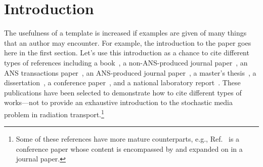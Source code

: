 \documentclass{article}                                                                           %
\begin{document}
\begin{abstract}
Having an appropriate {\LaTeX} template available when writing new papers saves authors time and effort.
As of the summer of 2017, the American Nuclear Society (ANS) had not had a {\LaTeX} template for submissions to their three journals: Nuclear Science and Engineering (NSE), Nuclear Technology (NT), and Fusion Science and Technology (FST).
While such a template may have existed in one or more forms and enjoyed use in a subset of the nuclear engineering community, asking colleagues did not yield knowledge of such a template.
We therefore asked the ANS editors if they would be interested in such a template, iterated with them to create one which was in agreement with the journal submission guidelines, and have provided it for the journal community to use.
Submissions need not strictly adhere to a specific form beyond what is specified in the submission guidelines since ANS will reformat accepted submissions for publication, we expect that this template will speed up the publishing process for researchers working with ANS.

\vspace{1em}\noindent\textbf{Keywords} --- ANS journal guidelines, ANS submission template, ANS bibliography style
\end{abstract}

\vfill


\pagebreak
\section{Introduction}

The usefulness of a template is increased if examples are given of many things that an author may encounter.
For example, the introduction to the paper goes here in the first section.
Let's use this introduction as a chance to cite different types of references including a book~\cite{Pomraning1991book}, a non-ANS-produced journal paper~\cite{AdamsJQSRT1989}, an ANS transactions paper~\cite{ZimmermanANS1991}, an ANS-produced journal paper~\cite{DonovanNSE2003}, a master's thesis~\cite{Vasques2005thesis}, a dissertation~\cite{Fichtl2009dissertation}, a conference paper~\cite{BrantleyMC2009Incident}, and a national laboratory report~\cite{PautzSAND2017AMClosurePres}.
These publications have been selected to demonstrate how to cite different types of works---not to provide an exhaustive introduction to the stochastic media problem in radiation transport.\footnote{Some of these references have more mature counterparts, e.g., Ref.~\cite{BrantleyMC2009Incident} is a conference paper whose content is encompassed by and expanded on in a journal paper.}
\end{document}
